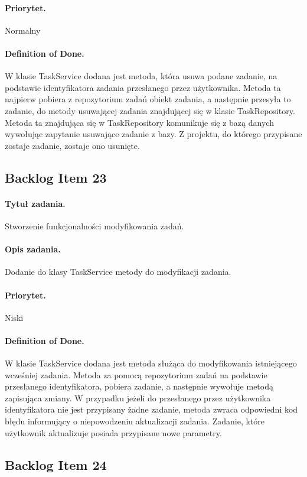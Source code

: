 \documentclass[a4paper]{article}
\begin{document}
\paragraph{Priorytet.} Normalny
\paragraph{Definition of Done.} W klasie TaskService dodana jest metoda, która usuwa podane zadanie, na podstawie identyfikatora zadania przesłanego przez użytkownika. Metoda ta najpierw pobiera z repozytorium zadań obiekt zadania, a następnie przesyła to zadanie, do metody usuwającej zadania znajdującej się w klasie TaskRepository. Metoda ta znajdująca się w TaskRepository komunikuje się z bazą danych wywołując zapytanie usuwające zadanie z bazy. Z projektu, do którego przypisane zostaje zadanie, zostaje ono usunięte.

\subsection{Backlog Item 23} 
\paragraph{Tytuł zadania.} Stworzenie funkcjonalności modyfikowania zadań.
\paragraph{Opis zadania.} Dodanie do klasy TaskService metody do modyfikacji zadania.
\paragraph{Priorytet.} Niski
\paragraph{Definition of Done.} W klasie TaskService dodana jest metoda służąca do modyfikowania istniejącego wcześniej zadania. Metoda za pomocą repozytorium zadań na podstawie przesłanego identyfikatora, pobiera zadanie, a następnie wywołuje metodą zapisująca zmiany. W przypadku jeżeli do przesłanego przez użytkownika identyfikatora nie jest przypisany żadne zadanie, metoda zwraca odpowiedni kod błędu informujący o niepowodzeniu aktualizacji zadania. Zadanie, które użytkownik aktualizuje posiada przypisane nowe parametry.


\subsection{Backlog Item 24} 
\end{document}

